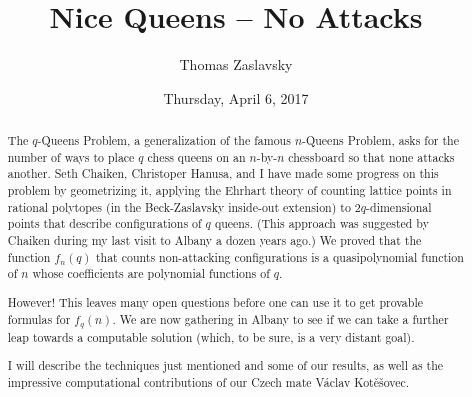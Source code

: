 \documentclass{UAmathtalk}
\author{Thomas Zaslavsky}
\title{Nice Queens -- No Attacks}
\date{Thursday, April 6, 2017}
\begin{document}
\maketitle

\begin{abstract}
The $q$-Queens Problem, a generalization of the famous $n$-Queens Problem, asks for the number of ways to place $q$ chess queens on an $n$-by-$n$ chessboard so that none attacks another.  Seth Chaiken, Christoper Hanusa, and I have made some progress on this problem by geometrizing it, applying the Ehrhart theory of counting lattice points in rational polytopes (in the Beck-Zaslavsky inside-out extension) to $2q$-dimensional points that describe configurations of $q$ queens.  (This approach was suggested by Chaiken during my last visit to Albany a dozen years ago.)  We proved that the function $f_n(q)$ that counts non-attacking configurations is a quasipolynomial function of $n$ whose coefficients are polynomial functions of $q$.

However!  This leaves many open questions before one can use it to get provable formulas for $f_q(n)$.  We are now gathering in Albany to see if we can take a further leap towards a computable solution (which, to be sure, is a very distant goal).

I will describe the techniques just mentioned and some of our results, as well as the impressive computational contributions of our Czech mate Václav Kotěšovec. 
\end{abstract}
\end{document}
